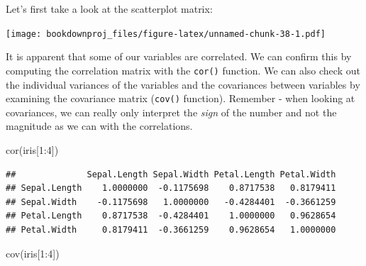 \documentclass[
]{article}
\newenvironment{Shaded}{\begin{snugshade}}{\end{snugshade}}
\newcommand{\AttributeTok}[1]{\textcolor[rgb]{0.77,0.63,0.00}{#1}}
\newcommand{\DecValTok}[1]{\textcolor[rgb]{0.00,0.00,0.81}{#1}}
\newcommand{\FunctionTok}[1]{\textcolor[rgb]{0.00,0.00,0.00}{#1}}
\newcommand{\NormalTok}[1]{#1}
\newcommand{\SpecialCharTok}[1]{\textcolor[rgb]{0.00,0.00,0.00}{#1}}
\newcommand{\StringTok}[1]{\textcolor[rgb]{0.31,0.60,0.02}{#1}}
\theoremstyle{definition}
\theoremstyle{definition}
\theoremstyle{definition}
\theoremstyle{definition}
\theoremstyle{remark}
\begin{document}
Let's first take a look at the scatterplot matrix:

\begin{Shaded}
\end{Shaded}

\texttt{[image: bookdownproj\_files/figure-latex/unnamed-chunk-38-1.pdf]}

It is apparent that some of our variables are correlated. We can confirm this by computing the correlation matrix with the \texttt{cor()} function. We can also check out the individual variances of the variables and the covariances between variables by examining the covariance matrix (\texttt{cov()} function). Remember - when looking at covariances, we can really only interpret the \emph{sign} of the number and not the magnitude as we can with the correlations.

\begin{Shaded}
\begin{Highlighting}[]
\FunctionTok{cor}\NormalTok{(iris[}\DecValTok{1}\SpecialCharTok{:}\DecValTok{4}\NormalTok{])}
\end{Highlighting}
\end{Shaded}

\begin{verbatim}
##              Sepal.Length Sepal.Width Petal.Length Petal.Width
## Sepal.Length    1.0000000  -0.1175698    0.8717538   0.8179411
## Sepal.Width    -0.1175698   1.0000000   -0.4284401  -0.3661259
## Petal.Length    0.8717538  -0.4284401    1.0000000   0.9628654
## Petal.Width     0.8179411  -0.3661259    0.9628654   1.0000000
\end{verbatim}

\begin{Shaded}
\begin{Highlighting}[]
\FunctionTok{cov}\NormalTok{(iris[}\DecValTok{1}\SpecialCharTok{:}\DecValTok{4}\NormalTok{])}
\end{Highlighting}
\end{Shaded}
\end{document}
